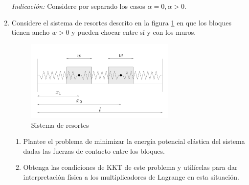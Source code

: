 \documentclass{article}
\begin{document}
\begin{enumerate}
	\textit{Indicación:} Considere por separado los casos \(\alpha = 0, \alpha > 0.\)
\item Considere el sistema de resortes descrito en la figura \ref{fig:lal} en que los bloques tienen ancho \(w > 0\) y pueden chocar entre sí y con los muros.
\begin{figure}[h]
	\centering
	\includegraphics[width=0.7\textwidth]{img/spring.png}
	\caption{Sistema de resortes}
	\label{fig:lal}
\end{figure}
	\begin{enumerate}
		\item Plantee el problema de minimizar la energía potencial elástica del sistema dadas las fuerzas de contacto entre los bloques.
		\item Obtenga las condiciones de KKT de este problema y utilícelas para dar interpretación física a los multiplicadores de Lagrange en esta situación.
	\end{enumerate}
\end{enumerate}
\end{document}
